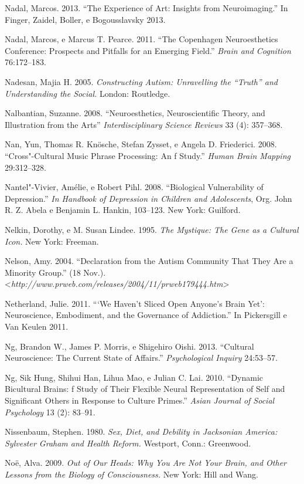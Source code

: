 Nadal, Marcos. 2013. ``The Experience of Art: Insights from
Neuroimaging.'' In Finger, Zaidel, Boller, e Bogousslavsky 2013.

Nadal, Marcos, e Marcus T. Pearce. 2011. ``The Copenhagen Neuroesthetics
Conference: Prospects and Pitfalls for an Emerging Field.'' \emph{Brain
and Cognition} 76:172--183.

Nadesan, Majia H. 2005. \emph{Constructing Autism: Unravelling the
``Truth'' and Understanding the Social.} London: Routledge.

Nalbantian, Suzanne. 2008. ``Neuroesthetics, Neuroscientific Theory, and
Illustration from the Arts'' \emph{Interdisciplinary Science Reviews} 33
(4): 357--368.

Nan, Yun, Thomas R. Knösche, Stefan Zysset, e Angela D. Friederici.
2008. ``Cross"-Cultural Music Phrase Processing: An f Study.''
\emph{Human Brain Mapping} 29:312--328.

Nantel"-Vivier, Amélie, e Robert Pihl. 2008. ``Biological Vulnerability
of Depression.'' \emph{In Handbook of Depression in Children and
Adolescents}, Org. John R. Z. Abela e Benjamin L. Hankin, 103--123. New
York: Guilford.

Nelkin, Dorothy, e M. Susan Lindee. 1995. \emph{The  Mystique: The
Gene as a Cultural Icon.} New York: Freeman.

Nelson, Amy. 2004. ``Declaration from the Autism Community That They Are
a Minority Group.'' (18 Nov.).
\textless{}\emph{http://www.prweb.com/releases/2004/11/prweb179444.htm}\textgreater{}

Netherland, Julie. 2011. ```We Haven't Sliced Open Anyone's Brain Yet':
Neuroscience, Embodiment, and the Governance of Addiction.'' In
Pickersgill e Van Keulen 2011.

Ng, Brandon W., James P. Morris, e Shigehiro Oishi. 2013. ``Cultural
Neuroscience: The Current State of Affairs.'' \emph{Psychological
Inquiry} 24:53--57.

Ng, Sik Hung, Shihui Han, Lihua Mao, e Julian C. Lai. 2010. ``Dynamic
Bicultural Brains: f Study of Their Flexible Neural Representation of
Self and Significant Others in Response to Culture Primes.'' \emph{Asian
Journal of Social Psychology} 13 (2): 83--91.

Nissenbaum, Stephen. 1980. \emph{Sex, Diet, and Debility in Jacksonian
America: Sylvester Graham and Health Reform.} Westport, Conn.:
Greenwood.

Noë, Alva. 2009. \emph{Out of Our Heads: Why You Are Not Your Brain, and
Other Lessons from the Biology of Consciousness.} New York: Hill and
Wang.

